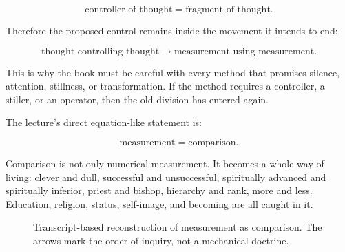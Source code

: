 \documentclass[11pt,oneside]{book}
\begin{document}
\begin{equation}
\text{controller of thought}
=
\text{fragment of thought}.
\end{equation}

Therefore the proposed control remains inside the movement it intends to end:

\begin{equation}
\text{thought controlling thought}
\longrightarrow
\text{measurement using measurement}.
\end{equation}

This is why the book must be careful with every method that promises silence, attention, stillness, or transformation. If the method requires a controller, a stiller, or an operator, then the old division has entered again.

The lecture's direct equation-like statement is:

\begin{equation}
\text{measurement}=\text{comparison}.
\end{equation}

Comparison is not only numerical measurement. It becomes a whole way of living: clever and dull, successful and unsuccessful, spiritually advanced and spiritually inferior, priest and bishop, hierarchy and rank, more and less. Education, religion, status, self-image, and becoming are all caught in it.

\begin{figure}
\centering
{}

Transcript-based reconstruction of measurement as comparison. The arrows mark the order of inquiry, not a mechanical doctrine.
\end{figure}
\end{document}
